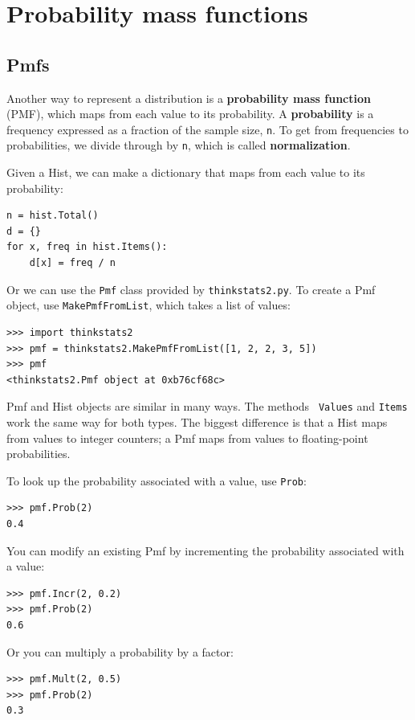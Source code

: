 \documentclass[12pt]{book}
\begin{document}
\chapter{Probability mass functions}

\section{Pmfs}

Another way to represent a distribution is a {\bf probability mass
  function} (PMF), which maps from each value to its probability.  A
{\bf probability} is a frequency expressed as a fraction of the sample
size, {\tt n}.  To get from frequencies to probabilities, we divide
through by {\tt n}, which is called {\bf normalization}.

Given a Hist, we can make a dictionary that maps from each
value to its probability:
%
\begin{verbatim}
n = hist.Total()
d = {}
for x, freq in hist.Items():
    d[x] = freq / n
\end{verbatim}
%
Or we can use the {\tt Pmf} class provided by {\tt thinkstats2.py}.
To create a Pmf object, use {\tt MakePmfFromList}, which takes a list
of values:
%
\begin{verbatim}
>>> import thinkstats2
>>> pmf = thinkstats2.MakePmfFromList([1, 2, 2, 3, 5])
>>> pmf
<thinkstats2.Pmf object at 0xb76cf68c>
\end{verbatim}

Pmf and Hist objects are similar in many ways.  The methods {\tt
  Values} and {\tt Items} work the same way for both types.  The
biggest difference is that a Hist maps from values to integer
counters; a Pmf maps from values to floating-point probabilities.

To look up the probability associated with a value, use {\tt Prob}:
%
\begin{verbatim}
>>> pmf.Prob(2)
0.4
\end{verbatim}

You can modify an existing Pmf by incrementing the probability
associated with a value:
%
\begin{verbatim}
>>> pmf.Incr(2, 0.2)
>>> pmf.Prob(2)
0.6
\end{verbatim}

Or you can multiply a probability by a factor:
%
\begin{verbatim}
>>> pmf.Mult(2, 0.5)
>>> pmf.Prob(2)
0.3
\end{verbatim}
\end{document}
